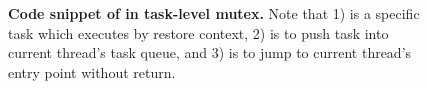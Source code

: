 \begin{figure}
\centering
\usebox{\tasklocklisting}
\caption{{\bf Code snippet of  in task-level mutex.} Note that 1)
 is a specific task which executes by restore context, 2)
 is to push task into current thread's task queue, and 3)
 is to jump to current thread's entry
point without return.}
\label{fig:tasklock}
\end{figure}

